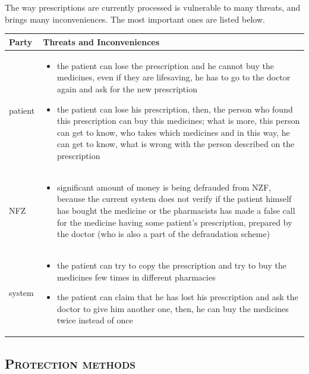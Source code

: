 \newpage
\chapter {}
The way prescriptions are currently processed is vulnerable to many threats, and brings many inconveniences. 
The most important ones are listed below.

\begin{tabularx}{\textwidth}{ |p{2.5cm}|X| }
	\hline
	\textbf{Party} &  \textbf{Threats and Inconveniences}\\
	\hline	
patient & \begin{itemize}
\item the patient can lose the prescription and he cannot buy the medicines, even if they are lifesaving, he has to go to the doctor again and ask for the new prescription
\item the patient can lose his prescription, then, the person who found this prescription can buy this medicines; what is more, this person can get to know, who takes which medicines and in this way, he can get to know, what is wrong with the person described on the prescription
\end{itemize} \\
\hline
	
NFZ & \begin{itemize}
\item significant amount of money is being defrauded from NZF, because the current system does not verify if the patient himself has bought the medicine or the pharmacists has made a false call for the medicine having some patient's prescription, prepared by the doctor (who is also a part of the defraudation scheme)
\end{itemize} \\
\hline

system & \begin{itemize}
\item the patient can try to copy the prescription and try to buy the medicines few times in different pharmacies
\item the patient can claim that he has lost his prescription and ask the doctor to give him another one, then, he can buy the medicines twice instead of once
\end{itemize} \\
\hline
\end{tabularx}

\section{\textsc{Protection methods}}
